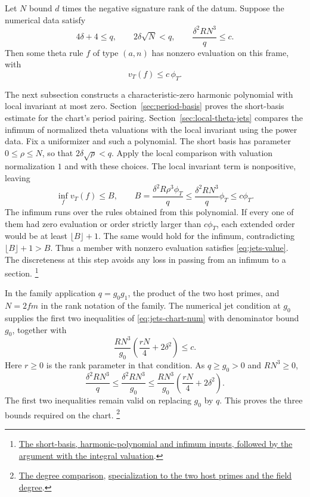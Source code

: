 Let \(N\) bound \(d\) times the negative signature rank of the
datum. Suppose the numerical data satisfy
\begin{equation}\label{eq:jets-chart-num}
    4\delta+4\le q,\qquad 2\delta\sqrt N<q,\qquad
    \frac{\delta^2 R N^3}{q}\le c .
\end{equation}
Then some theta rule \(f\) of type \((a,n)\) has nonzero evaluation
on this frame, with
\begin{equation}\label{eq:jets-value}
                   v_T(f)\le c\,\phi_T .
\end{equation}

The next subsection constructs a characteristic-zero harmonic
polynomial with local invariant at most zero. Section~\ref{sec:period-basis} proves the short-basis estimate
for the chart's period pairing. Section~\ref{sec:local-theta-jets} compares the infimum of normalized
theta valuations with the local invariant using the power data. Fix a uniformizer and such a polynomial. The short
basis has parameter \(0\le\rho\le N\), so that
\(2\delta\sqrt{\rho}<q\). Apply the local comparison with valuation
normalization \(1\) and with these choices. The local invariant term
is nonpositive, leaving
\[
    \inf_f v_T(f)\le B,\qquad
    B=\frac{\delta^2 R\rho^3\phi_T}{q}
       \le \frac{\delta^2 RN^3}{q}\phi_T\le c\phi_T .
\]
The infimum runs over the rules obtained from this polynomial.
If every one of them had zero evaluation or order strictly larger
than \(c\phi_T\), each extended order would be at least
\(\lfloor B\rfloor+1\). The same would hold for the infimum,
contradicting \(\lfloor B\rfloor+1>B\). Thus a member with nonzero
evaluation satisfies \eqref{eq:jets-value}. The discreteness at this
step avoids any loss in passing from an infimum to a section.
\footnote{\href{https://github.com/Deicyde/riemann-hypothesis/blob/40e56bab/src/Development/AbelianVarietyTheory/Proofs/DivisorProofs/ReflectionSumJetNumber.lean\#L52-L98}{The short-basis, harmonic-polynomial and infimum inputs, followed by the argument with the integral valuation}.}

In the family application \(q=g_0g_1\), the product of the two host
primes, and \(N=2fm\) in the rank notation of the family. The
numerical jet condition at \(g_0\) supplies the first two inequalities
of \eqref{eq:jets-chart-num} with denominator bound \(g_0\), together
with
\[
       \frac{RN^3}{g_0}\left(\frac{rN}{4}+2\delta^2\right)\le c.
\]
Here \(r\ge0\) is the rank parameter in that condition. As
\(q\ge g_0>0\) and \(RN^3\ge0\),
\[
       \frac{\delta^2RN^3}{q}
       \le\frac{\delta^2 RN^3}{g_0}
       \le\frac{RN^3}{g_0}\left(\frac{rN}{4}+2\delta^2\right).
\]
The first two inequalities remain valid on replacing \(g_0\) by
\(q\). This proves the three bounds required on the chart.
\footnote{\href{https://github.com/Deicyde/riemann-hypothesis/blob/40e56bab/src/Development/AbelianVarietyTheory/Proofs/DivisorProofs/ReflectionSumJetNumber.lean\#L42-L50}{The degree comparison},
\href{https://github.com/Deicyde/riemann-hypothesis/blob/40e56bab/src/Development/AutomorphicArithmetic/ThetaCorrespondence/ThetaPairLifts/ThirdPlaceSeries/ExistsThetaRuleValueLeCoverCharZero.lean\#L47-L72}{specialization to the two host primes and the field degree}.}

